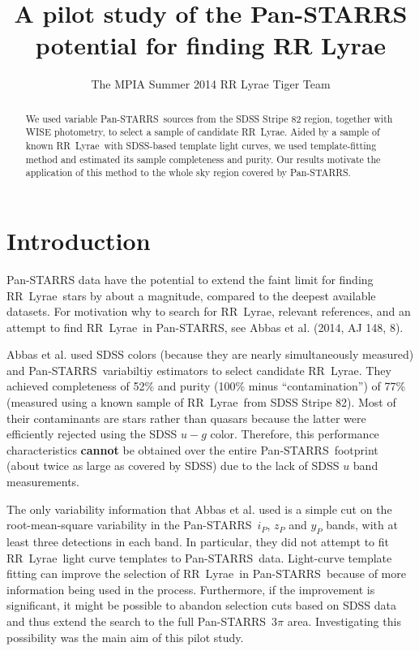 \documentclass[12pt, preprint]{aastex}
\def\PS  {\hbox{Pan-STARRS}}
\def\RR  {\hbox{RR Lyrae}}
\begin{document}
\title{A pilot study of the Pan-STARRS potential for finding RR Lyrae}
\author{The MPIA Summer 2014 RR Lyrae Tiger Team}
 

\begin{abstract}
We used variable \PS\ sources from the SDSS Stripe 82 region, together with WISE
photometry, to select a sample of candidate \RR. Aided by a sample of known
\RR\ with SDSS-based template light curves, we used template-fitting method
and estimated its sample completeness and purity. Our results motivate 
the application of this method to the whole sky region covered by \PS. 
\end{abstract}


\section{Introduction}

Pan-STARRS data have the potential to extend the faint limit for finding \RR\ stars by about 
a magnitude, compared to the deepest available datasets. For motivation why to 
search for \RR, relevant references, and an attempt to find \RR\ in \PS, see
Abbas et al. (2014, AJ 148, 8). 

Abbas et al. used SDSS colors (because they are nearly simultaneously measured)
and \PS\ variabiltiy estimators to select candidate \RR. They achieved completeness
of 52\% and purity (100\% minus ``contamination'') of 77\% (measured using a known sample 
of \RR\ from SDSS Stripe 82). Most of their contaminants are stars rather than quasars 
because the latter were efficiently rejected using the SDSS $u-g$ color. Therefore,
this performance characteristics {\bf cannot} be obtained over the entire \PS\ footprint
(about twice as large as covered by SDSS) due to the lack of SDSS $u$ band measurements. 

The only variability information that Abbas et al. used is a simple cut on the 
root-mean-square variability in the \PS\ $i_P$, $z_P$ and $y_P$ bands, with
at least three detections in each band. In particular, they did not attempt to fit 
\RR\ light curve templates to \PS\ data.  Light-curve template fitting can improve the 
selection of \RR\ in \PS\ because of more information being used in the process. 
Furthermore, if the improvement is significant, it might be possible to abandon 
selection cuts based on SDSS data and thus extend the search to the full \PS\ 3$\pi$ area.
Investigating this possibility was the main aim of this pilot study. 
\end{document}
